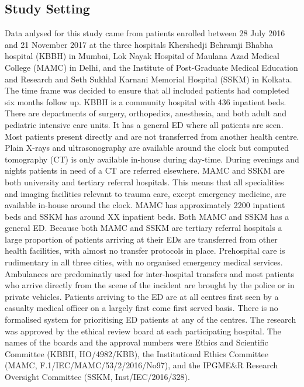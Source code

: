 \documentclass[10pt,letterpaper]{article}\usepackage[]{graphicx}\usepackage[]{color}
\begin{document}
\subsection*{Study Setting}
Data anlysed for this study came from patients enrolled between 28 July 2016 and
21 November 2017 at the three hospitals Khershedji Behramji Bhabha hospital
(KBBH) in Mumbai, Lok Nayak Hospital of Maulana Azad Medical College (MAMC) in
Delhi, and the Institute of Post-Graduate Medical Education and Research and
Seth Sukhlal Karnani Memorial Hospital (SSKM) in Kolkata. The time frame was
decided to ensure that all included patients had completed six months follow
up. KBBH is a community hospital with 436 inpatient beds. There are departments
of surgery, orthopedics, anesthesia, and both adult and pediatric intensive care
units. It has a general ED where all patients are seen. Most patients present
directly and are not transferred from another health centre. Plain X-rays and
ultrasonography are available around the clock but computed tomography (CT) is
only available in-house during day-time. During evenings and nights patients in
need of a CT are referred elsewhere. MAMC and SSKM are both university and
tertiary referral hospitals. This means that all specialities and imaging
facilities relevant to trauma care, except emergency medicine, are available
in-house around the clock. MAMC has approximately 2200 inpatient beds and SSKM
has around XX inpatient beds. Both MAMC and SSKM has a general ED. Because both
MAMC and SSKM are tertiary referral hospitals a large proportion of patients
arriving at their EDs are transferred from other health facilities, with almost
no transfer protocols in place. Prehospital care is rudimentary in all three
cities, with no organised emergency medical services. Ambulances are
predominatly used for inter-hospital transfers and most patients who arrive
directly from the scene of the incident are brought by the police or in private
vehicles. Patients arriving to the ED are at all centres first seen by a
casualty medical officer on a largely first come first served basis. There is no
formalised system for prioritising ED patients at any of the centres. The
research was approved by the ethical review board at each participating
hospital. The names of the boards and the approval numbers were Ethics and
Scientific Committee (KBBH, HO/4982/KBB), the Institutional Ethics Committee
(MAMC, F.1/IEC/MAMC/53/2/2016/No97), and the IPGME\&R Research Oversight
Committee (SSKM, Inst/IEC/2016/328).

\end{document}
